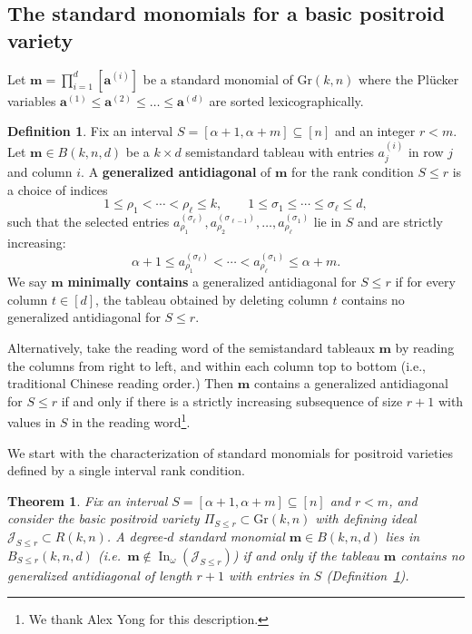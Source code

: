 \documentclass[12pt,reqno]{amsart}
\newtheorem{theorem}[lemma]{Theorem}
\theoremstyle{definition}
\newtheorem{definition}[lemma]{Definition}
\newcommand{\inn}{\operatorname{In}}
\renewcommand{\aa}{\mathbf a}
\newcommand{\mm}{\mathbf m}
\newcommand{\cJ}{\mathcal{J}}
\newcommand{\gr}{\mathrm{Gr}}
\begin{document}
{\subsection{The standard monomials for a basic positroid variety} 

Let $\mm = \prod_{i = 1}^d [\aa^{(i)}]$ be a standard monomial of $\gr(k,n)$ where the Pl\"ucker variables $\aa^{(1)} \leq \aa^{(2)} \leq \dots \leq \aa^{(d)}$ are sorted lexicographically. 

\begin{definition}\label{def:antidiag}
Fix an interval \(S=[\alpha+1,\alpha+m]\subseteq[n]\) and an integer \(r<m\).
Let \(\mm\in B(k,n,d)\) be a \(k\times d\) semistandard tableau with entries
\(a^{(i)}_j\) in row \(j\) and column \(i\).
A \textbf{generalized antidiagonal} of \(\mm\) for the rank condition \(S\le r\) is a choice of
indices
\[
1\le \rho_1<\cdots<\rho_\ell\le k,
\qquad
1\le \sigma_1\le \cdots \le \sigma_\ell\le d,
\]
such that the selected entries
\(
a^{(\sigma_\ell)}_{\rho_1}, a^{(\sigma_{\ell-1})}_{\rho_2},\dots,a^{(\sigma_1)}_{\rho_\ell}
\)
lie in \(S\) and are strictly increasing:
\[
\alpha+1\le a^{(\sigma_\ell)}_{\rho_1}<\cdots<a^{(\sigma_1)}_{\rho_\ell}\le \alpha+m.
\]
We say \(\mm\) \textbf{minimally contains} a generalized antidiagonal for \(S\le r\) if
for every column \(t\in[d]\), the tableau obtained by deleting column \(t\)
contains no generalized antidiagonal for \(S\le r\).
\end{definition}



Alternatively, take the reading word of the semistandard tableaux $\mm$ by reading the columns from right to left, and within each column top to bottom (i.e., traditional Chinese reading order.) 
Then $\mm$ contains a generalized antidiagonal for $S\leq r$ if and only if there is a strictly increasing subsequence of size $r+1$ with values in $S$ in the reading word\footnote{We thank Alex Yong for this description.}.

We start with the characterization of standard monomials for positroid varieties defined by a single interval rank condition.

\begin{theorem}\label{thm:initial-ideal}
Fix an interval \(S=[\alpha+1,\alpha+m]\subseteq[n]\) and \(r<m\), and consider the basic positroid variety
\(\Pi_{S\le r}\subset \gr(k,n)\) with defining ideal \(\cJ_{S\le r}\subset R(k,n)\).
A degree-\(d\) standard monomial \(\mm\in B(k,n,d)\) lies in \(B_{S\le r}(k,n,d)\)
(i.e.\ \(\mm\notin \inn_\omega(\cJ_{S\le r})\))
if and only if the tableau \(\mm\) contains no generalized antidiagonal of length \(r+1\)
with entries in \(S\) (Definition~\ref{def:antidiag}).
\end{theorem}



}
\end{document}
